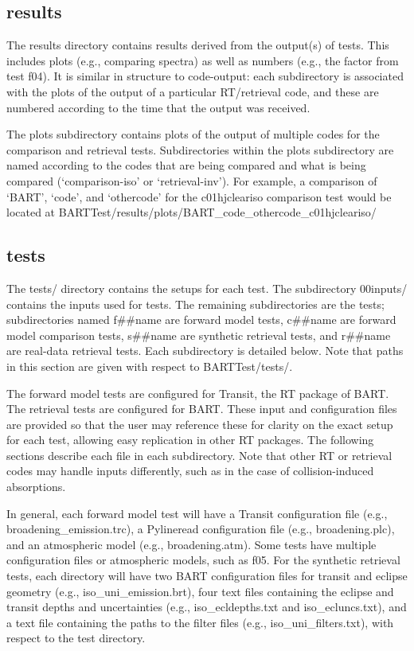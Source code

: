 \documentclass[letterpaper, 12pt]{article}
\begin{document}
\subsection{results}
\label{sec:results}
The results directory contains results derived from the output(s) of tests. 
This includes plots (e.g., comparing spectra) as well as numbers (e.g., the 
factor from test f04). It is 
similar in structure to code-output: each subdirectory is associated with 
the plots of the output of a particular RT/retrieval code, and these are numbered 
according to the time that the output was received. 

The plots subdirectory contains plots of the output of multiple codes for 
the comparison and retrieval tests. Subdirectories within the plots 
subdirectory are named according to the codes that are being compared and 
what is being compared (`comparison-iso' or `retrieval-inv'). For example, a 
comparison of `BART', `code', and `othercode' for the c01hjcleariso comparison 
test would be located at 
BARTTest/results/plots/BART{\_}code{\_}othercode{\_}c01hjcleariso/

\subsection{tests}
\label{sec:tests}
The tests/ directory contains the setups for each test. 
The subdirectory 00inputs/ contains the inputs used for tests. 
The remaining subdirectories are the tests; subdirectories named f{\#}{\#}name are forward 
model tests, c{\#}{\#}name are forward model comparison tests, s{\#}{\#}name are synthetic retrieval tests, and r{\#}{\#}name are real-data retrieval tests. 
Each subdirectory is detailed below. 
Note that paths in this section are given with respect to BARTTest/tests/.

The forward model tests are configured for Transit, the RT package of BART. 
The retrieval tests are configured for BART. 
These input and configuration files are provided so that the user may reference these for clarity on the exact setup for each test, allowing easy replication in other RT packages. 
The following sections describe each file in each subdirectory. 
Note that other RT or retrieval codes may handle inputs differently, such as in the case of collision-induced absorptions.

In general, each forward model test will have a Transit configuration file (e.g., broadening{\_}emission.trc), a Pylineread configuration file (e.g., broadening.plc), and an atmospheric model (e.g., broadening.atm). 
Some tests have multiple configuration files or atmospheric models, such as f05. 
For the synthetic retrieval tests, each directory will have two BART configuration files for transit and eclipse geometry (e.g., iso{\_}uni{\_}emission.brt), four text files containing the eclipse and transit depths and uncertainties (e.g., iso{\_}ecldepths.txt and iso{\_}ecluncs.txt), and a text file containing the paths to the filter files (e.g., iso{\_}uni{\_}filters.txt), with respect to the test directory.
\end{document}
